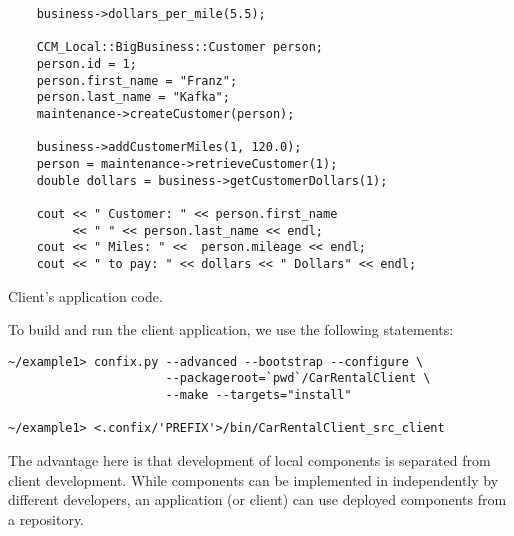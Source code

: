 \begin{Example}
\begin{minifbox}
\begin{small}
\begin{verbatim}
    business->dollars_per_mile(5.5);
    
    CCM_Local::BigBusiness::Customer person;
    person.id = 1;
    person.first_name = "Franz";
    person.last_name = "Kafka";
    maintenance->createCustomer(person);

    business->addCustomerMiles(1, 120.0); 
    person = maintenance->retrieveCustomer(1);
    double dollars = business->getCustomerDollars(1); 

    cout << " Customer: " << person.first_name 
         << " " << person.last_name << endl;
    cout << " Miles: " <<  person.mileage << endl;
    cout << " to pay: " << dollars << " Dollars" << endl;
\end{verbatim}
\end{small}
\end{minifbox}
\caption{Client's application code.}
\label{example:ClientApplication}
\end{Example}

To build and run the client application, we use the following statements:
\begin{small}
\begin{verbatim}
~/example1> confix.py --advanced --bootstrap --configure \
                      --packageroot=`pwd`/CarRentalClient \
                      --make --targets="install"

~/example1> <.confix/'PREFIX'>/bin/CarRentalClient_src_client
\end{verbatim}
\end{small}


The advantage here is that development of local components is separated from
client development. 
While components can be implemented in independently by different developers, an
application (or client) can use deployed components from a repository.

